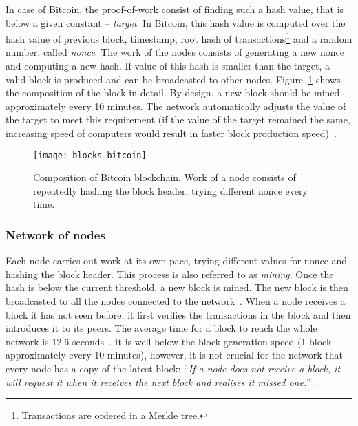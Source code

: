 In case of Bitcoin, the proof-of-work consist of finding such a hash value, that is below a given constant -- \textit{target}. In Bitcoin, this hash value is computed over the hash value of previous block, timestamp\footnotemark, root hash of transactions\footnote{Transactions are ordered in a Merkle tree.} and a random number, called \textit{nonce}. The work of the nodes consists of generating a new nonce and computing a new hash. If value of this hash is smaller than the target, a valid block is produced and can be broadcasted to other nodes. Figure~\ref{fig:blocks-bitcoin} shows the composition of the block in detail. By design, a new block should be mined approximately every 10 minutes. The network automatically adjusts the value of the target to meet this requirement (if the value of the target remained the same, increasing speed of computers would result in faster block production speed)~\cite{Decker2013InformationNetwork}.
% 
% 
\begin{figure}[ht]
    \centering
    \texttt{[image: blocks-bitcoin]}
    \caption{Composition of Bitcoin blockchain. Work of a node consists of repeatedly hashing the block header, trying different nonce every time.}
    \label{fig:blocks-bitcoin}
\end{figure}
% 
\subsubsection{Network of nodes}
Each node carries out work at its own pace, trying different values for nonce and hashing the block header. This process is also referred to as \textit{mining}. Once the hash is below the current threshold, a new block is mined. The new block is then broadcasted to all the nodes connected to the network~\cite{NakamotoBitcoin:System}. When a node receives a block it has not seen before, it first verifies the transactions in the block and then introduces it to its peers. The average time for a block to reach the whole network is 12.6 seconds~\cite{Decker2013InformationNetwork}. It is well below the block generation speed (1 block approximately every 10 minutes), however, it is not crucial for the network that every node has a copy of the latest block: ``\textit{If a node does not receive a block, it will request it when it receives the next block and realises it missed one.}''~\cite{NakamotoBitcoin:System}.
% 
